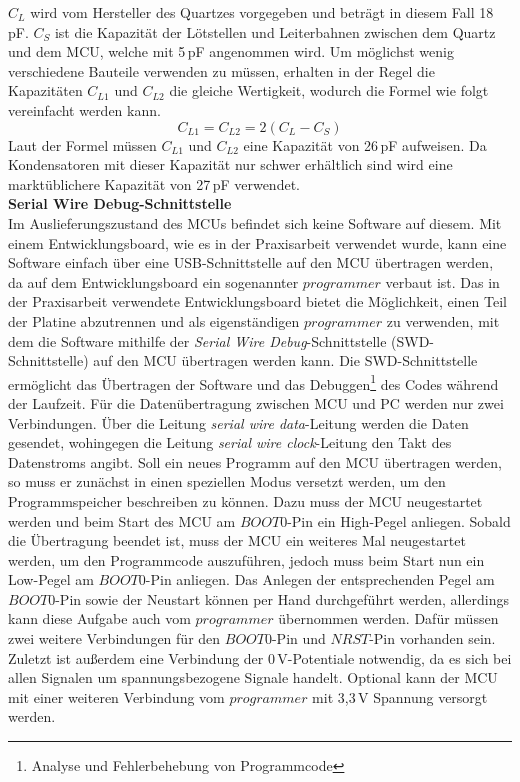 \textit{$C_L$} wird vom Hersteller des Quartzes vorgegeben und beträgt in diesem Fall 18\,pF. \textit{$C_S$} ist die Kapazität der Lötstellen und Leiterbahnen zwischen dem Quartz und dem MCU, welche mit 5\,pF angenommen wird. Um möglichst wenig verschiedene Bauteile verwenden zu müssen, erhalten in der Regel die Kapazitäten $C_{L1}$ und $C_{L2}$ die gleiche Wertigkeit, wodurch die Formel wie folgt vereinfacht werden kann.
\begin{equation}
	C_{L1} =  C_{L2} = 2(C_L - C_S)
\end{equation}
Laut der Formel müssen $C_{L1}$ und $C_{L2}$ eine Kapazität von 26\,pF aufweisen. Da Kondensatoren mit dieser Kapazität nur schwer erhältlich sind wird eine marktüblichere Kapazität von 27\,pF verwendet.\\
\newline
\textbf{Serial Wire Debug-Schnittstelle}\\
Im Auslieferungszustand des MCUs befindet sich keine Software auf diesem. Mit einem Entwicklungsboard, wie es in der Praxisarbeit verwendet wurde, kann eine Software einfach über eine USB-Schnittstelle auf den MCU übertragen werden, da auf dem Entwicklungsboard ein sogenannter $programmer$ verbaut ist. Das in der Praxisarbeit verwendete Entwicklungsboard bietet die Möglichkeit, einen Teil der Platine abzutrennen und als eigenständigen $programmer$ zu verwenden, mit dem die Software mithilfe der \textit{Serial Wire Debug}-Schnittstelle (SWD-Schnittstelle) auf den MCU übertragen werden kann. Die SWD-Schnittstelle ermöglicht das Übertragen der Software und das Debuggen\footnote{Analyse und Fehlerbehebung von Programmcode} des Codes während der Laufzeit. Für die Datenübertragung zwischen MCU und PC werden nur zwei Verbindungen. Über die Leitung \textit{serial wire data}-Leitung werden die Daten gesendet, wohingegen die Leitung \textit{serial wire clock}-Leitung den Takt des Datenstroms angibt. Soll ein neues Programm auf den MCU übertragen werden, so muss er zunächst in einen speziellen Modus versetzt werden, um den Programmspeicher beschreiben zu können. Dazu muss der MCU neugestartet werden und beim Start des MCU am $BOOT0$-Pin ein High-Pegel anliegen. Sobald die Übertragung beendet ist, muss der MCU ein weiteres Mal neugestartet werden, um den Programmcode auszuführen, jedoch muss beim Start nun ein Low-Pegel am $BOOT0$-Pin anliegen. Das Anlegen der entsprechenden Pegel am $BOOT0$-Pin sowie der Neustart können per Hand durchgeführt werden, allerdings kann diese Aufgabe auch vom $programmer$ übernommen werden. Dafür müssen zwei weitere Verbindungen für den $BOOT0$-Pin und $NRST$-Pin vorhanden sein. Zuletzt ist außerdem eine Verbindung der 0\,V-Potentiale notwendig, da es sich bei allen Signalen um spannungsbezogene Signale handelt. Optional kann der MCU mit einer weiteren Verbindung vom $programmer$ mit 3,3\,V Spannung versorgt werden.\\
